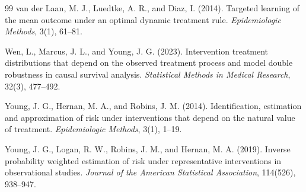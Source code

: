 \documentclass[11pt]{article}
\theoremstyle{definition}
\theoremstyle{plain}
\theoremstyle{remark}
\begin{document}
\begin{thebibliography}{99}
van der Laan, M. J., Luedtke, A. R., and Diaz, I. (2014).
\newblock Targeted learning of the mean outcome under an optimal dynamic treatment rule.
\newblock \emph{Epidemiologic Methods}, 3(1), 61--81.

Wen, L., Marcus, J. L., and Young, J. G. (2023).
\newblock Intervention treatment distributions that depend on the observed treatment process and model double robustness in causal survival analysis.
\newblock \emph{Statistical Methods in Medical Research}, 32(3), 477--492.

Young, J. G., Hernan, M. A., and Robins, J. M. (2014).
\newblock Identification, estimation and approximation of risk under interventions that depend on the natural value of treatment.
\newblock \emph{Epidemiologic Methods}, 3(1), 1--19.

Young, J. G., Logan, R. W., Robins, J. M., and Hernan, M. A. (2019).
\newblock Inverse probability weighted estimation of risk under representative interventions in observational studies.
\newblock \emph{Journal of the American Statistical Association}, 114(526), 938--947.
\end{thebibliography}
\end{document}
